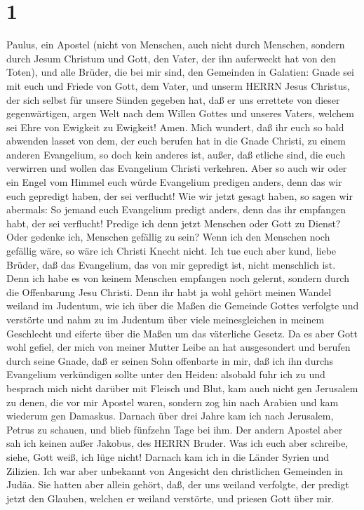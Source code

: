 \hypertarget{section}{%
\section{1}\label{section}}

 Paulus, ein Apostel (nicht von Menschen, auch nicht durch
Menschen, sondern durch Jesum Christum und Gott, den Vater, der ihn
auferweckt hat von den Toten),  und alle Brüder, die bei mir
sind, den Gemeinden in Galatien:  Gnade sei mit euch und
Friede von Gott, dem Vater, und unserm HERRN Jesus Christus,
 der sich selbst für unsere Sünden gegeben hat, daß er uns
errettete von dieser gegenwärtigen, argen Welt nach dem Willen Gottes
und unseres Vaters,  welchem sei Ehre von Ewigkeit zu
Ewigkeit! Amen.  Mich wundert, daß ihr euch so bald abwenden
lasset von dem, der euch berufen hat in die Gnade Christi, zu einem
anderen Evangelium,  so doch kein anderes ist, außer, daß
etliche sind, die euch verwirren und wollen das Evangelium Christi
verkehren.  Aber so auch wir oder ein Engel vom Himmel euch
würde Evangelium predigen anders, denn das wir euch gepredigt haben, der
sei verflucht!  Wie wir jetzt gesagt haben, so sagen wir
abermals: So jemand euch Evangelium predigt anders, denn das ihr
empfangen habt, der sei verflucht!  Predige ich denn jetzt
Menschen oder Gott zu Dienst? Oder gedenke ich, Menschen gefällig zu
sein? Wenn ich den Menschen noch gefällig wäre, so wäre ich Christi
Knecht nicht.  Ich tue euch aber kund, liebe Brüder, daß
das Evangelium, das von mir gepredigt ist, nicht menschlich ist.
 Denn ich habe es von keinem Menschen empfangen noch
gelernt, sondern durch die Offenbarung Jesu Christi.  Denn
ihr habt ja wohl gehört meinen Wandel weiland im Judentum, wie ich über
die Maßen die Gemeinde Gottes verfolgte und verstörte  und
nahm zu im Judentum über viele meinesgleichen in meinem Geschlecht und
eiferte über die Maßen um das väterliche Gesetz.  Da es
aber Gott wohl gefiel, der mich von meiner Mutter Leibe an hat
ausgesondert und berufen durch seine Gnade,  daß er seinen
Sohn offenbarte in mir, daß ich ihn durchs Evangelium verkündigen sollte
unter den Heiden: alsobald fuhr ich zu und besprach mich nicht darüber
mit Fleisch und Blut,  kam auch nicht gen Jerusalem zu
denen, die vor mir Apostel waren, sondern zog hin nach Arabien und kam
wiederum gen Damaskus.  Darnach über drei Jahre kam ich
nach Jerusalem, Petrus zu schauen, und blieb fünfzehn Tage bei ihm.
 Der andern Apostel aber sah ich keinen außer Jakobus, des
HERRN Bruder.  Was ich euch aber schreibe, siehe, Gott
weiß, ich lüge nicht!  Darnach kam ich in die Länder Syrien
und Zilizien.  Ich war aber unbekannt von Angesicht den
christlichen Gemeinden in Judäa.  Sie hatten aber allein
gehört, daß, der uns weiland verfolgte, der predigt jetzt den Glauben,
welchen er weiland verstörte,  und priesen Gott über mir.

